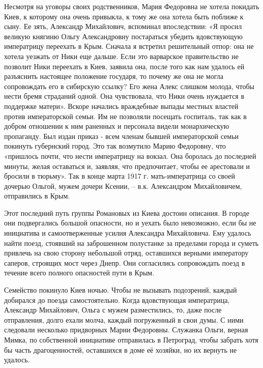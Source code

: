 Несмотря на уговоры своих родственников, Мария Федоровна не хотела покидать
Киев, к которому она очень привыкла, к тому же она хотела быть поближе к сыну.
Ее зять, Александр Михайлович, вспоминал впоследствии: «Я просил великую
княгиню Ольгу Александровну постараться убедить вдовствующую императрицу
переехать в Крым. Сначала я встретил решительный отпор: она не хотела уезжать
от Ники еще дальше. Если это варварское правительство не позволит Ники
переехать в Киев, заявила она, после того как нам удалось ей разъяснить
настоящее положение государя, то почему же она не могла сопровождать его в
сибирскую ссылку? Его жена Алекс слишком молода, чтобы нести бремя страданий
одной. Она чувствовала, что Ники очень нуждается в поддержке матери». Вскоре
начались враждебные выпады местных властей против императорской семьи. Им не
позволяли посещать госпиталь, так как в добром отношении к ним раненных и
персонала видели монархическую пропаганду. Был издан приказ - всем членам
бывшей императорской семьи покинуть губернский город. Это так возмутило Марию
Федоровну, что «пришлось почти, что нести императрицу на вокзал. Она боролась
до последней минуты, желая оставаться и, заявляя, что предпочитает, чтобы ее
арестовали и бросили в тюрьму». Так в конце марта 1917 г. мать-императрица со
своей дочерью Ольгой, мужем дочери Ксении, – в.к. Александром Михайловичем,
отправились в Крым.

Этот последний путь группы Романовых из Киева достоин описания. В городе они
подвергались большой опасности, но и уехать было невозможно, если бы не
инициатива и самоотверженные усилия Александра Михайловича. Ему удалось найти
поезд, стоявший на заброшенном полустанке за пределами города и суметь привлечь
на свою сторону небольшой отряд, оставшихся верными императору саперов,
строящих мост через Днепр. Они согласились сопровождать поезд в течение всего
полного опасностей пути в Крым.

Семейство покинуло Киев ночью. Чтобы не вызывать подозрений, каждый добирался
до поезда самостоятельно. Когда вдовствующая императрица, Александр Михайлович,
Ольга с мужем разместились, то, даже после отправления, долго ехали молча,
каждый погруженный в свои думы. С ними следовали несколько придворных Марии
Федоровны. Служанка Ольги, верная Мимка, по собственной инициативе отправилась
в Петроград, чтобы забрать хотя бы часть драгоценностей, оставшихся в доме её
хозяйки, но их вернуть не удалось. 

